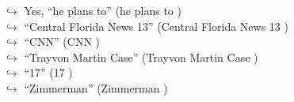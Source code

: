 \documentclass[11pt,a4paper, onecolumn]{article}
\begin{document}
\begin{figure}[t]
\begin{tcolorbox}[boxsep=0pt,left=5pt,right=0pt,top=2pt,colback = yellow!5]
\begin{dialogue}
\colorbox{pink!25}{$\hookrightarrow$}
\colorbox{red!25}{Yes,}
{ ``he plans to'' (he plans to ) }
\\
\colorbox{pink!25}{$\hookrightarrow$}
{ ``Central Florida News 13'' (Central Florida News 13 ) }
\\
\colorbox{pink!25}{$\hookrightarrow$}
{ ``CNN'' (CNN ) }
\\
\colorbox{pink!25}{$\hookrightarrow$}
{ ``Trayvon Martin Case'' (Trayvon Martin Case ) }
\\
\colorbox{pink!25}{$\hookrightarrow$}
{ ``17'' (17 ) }
\\
\colorbox{pink!25}{$\hookrightarrow$}
{ ``Zimmerman'' (Zimmerman ) }
 \end{dialogue}\end{tcolorbox}\end{figure}
\end{document}
